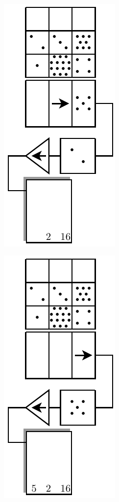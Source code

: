 \begin{figure}[htpb]
\begin{subfigure}[t]{0.25\textwidth}
		\caption{}
		\label{fig:ccd-registry-3}
	\end{subfigure}%
	\begin{subfigure}[t]{0.25\textwidth}
		\centering
		\includegraphics[scale=1.0]{ccd-registry-4.pdf}
		\caption{}
		\label{fig:ccd-registry-4}
	\end{subfigure}%
	\begin{subfigure}[t]{0.25\textwidth}
		\centering
		\includegraphics[scale=1.0]{ccd-registry-5.pdf}

\end{subfigure}
\end{figure}
